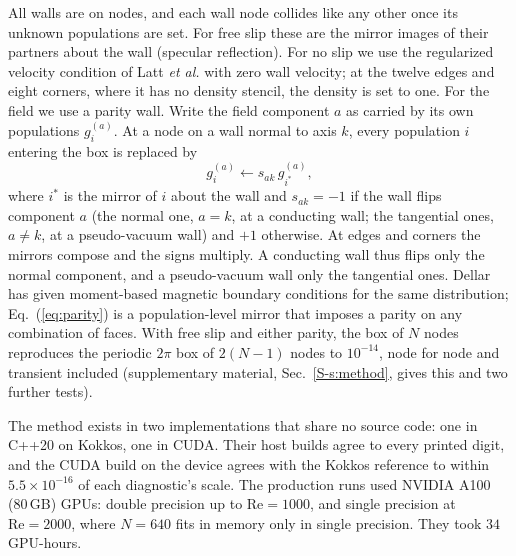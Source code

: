 \documentclass[aip,pop,reprint,amsmath,amssymb,superscriptaddress,floatfix]{revtex4-2}
\newcommand{\Rey}{\mathrm{Re}}
\begin{document}
\begin{table}
\caption{\label{tab:runs}Runs: two grids per rung. $\delta/h$ is the number of
lattice spacings in the layer thickness $\delta=\Rey^{-1/2}$; $\tau-\frac12$ is the
fluid relaxation parameter; steps to $t=10$ and the largest lattice Mach number over A
and B are for the finer grid; ``bits'' is the floating-point precision.}
\begin{ruledtabular}

\end{ruledtabular}
\end{table}

All walls are on nodes, and each wall node collides like any other once its unknown
populations are set. For free slip these are the mirror images of their partners
about the wall (specular reflection). For no slip we use the regularized velocity
condition of Latt \textit{et al.}\cite{latt2008} with zero wall velocity; at the
twelve edges and eight corners, where it has no density stencil, the density is set
to one. For the field we use a parity wall. Write the field component $a$ as carried
by its own populations $g^{(a)}_i$. At a node on a wall normal to axis $k$, every
population $i$ entering the box is replaced by
\begin{equation}
  g^{(a)}_i \leftarrow s_{ak}\, g^{(a)}_{i^*},
  \label{eq:parity}
\end{equation}
where $i^*$ is the mirror of $i$ about the wall and $s_{ak}=-1$ if the wall flips
component $a$ (the normal one, $a=k$, at a conducting wall; the tangential ones,
$a\ne k$, at a pseudo-vacuum wall) and $+1$ otherwise. At edges and corners the mirrors
compose and the signs multiply. A conducting wall thus flips only the normal
component, and a pseudo-vacuum wall only the tangential ones. Dellar has given
moment-based magnetic boundary conditions for the same
distribution;\cite{dellar2013} Eq.~(\ref{eq:parity}) is a population-level mirror
that imposes a parity on any combination of faces. With free slip and either parity,
the box of $N$ nodes reproduces the periodic $2\pi$ box of $2(N-1)$ nodes to
$10^{-14}$, node for node and transient included (supplementary material,
Sec.~\ref{S-s:method}, gives this and two further tests).

The method exists in two implementations that share no source code: one in C++20 on
Kokkos,\cite{edwards2014,trott2022} one in CUDA. Their host builds agree to every
printed digit, and the CUDA build on the device agrees with the Kokkos reference to
within $5.5\times10^{-16}$ of each diagnostic's scale. The production runs used NVIDIA
A100 (80\,GB) GPUs: double precision up to $\Rey=1000$, and single precision at
$\Rey=2000$, where $N=640$ fits in memory only in single precision. They took $34$
GPU-hours.
\end{document}
